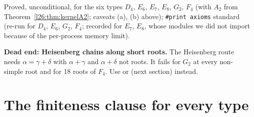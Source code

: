 \begin{status}
Proved, unconditional, for the six types $D_4$, $E_6$, $E_7$, $E_8$, $G_2$, $F_4$ (with $A_2$ from
Theorem~\ref{l26:thm:kernelA2}; caveats (a), (b) above); \texttt{\#print axioms} standard (re-run for $D_4$, $E_6$, $G_2$, $F_4$; recorded for
$E_7$, $E_8$, whose modules we did not import because of the per-process memory limit).
\end{status}

\begin{warning}
\textbf{Dead end: Heisenberg chains along short roots.} The Heisenberg route needs $\alpha=\gamma+\delta$ with $\alpha+\gamma$ and
$\alpha+\delta$ not roots. It fails for $G_2$ at every non-simple root and for 18 roots of $F_4$. Use  or
 (next section) instead.
\end{warning}

\section{The finiteness clause for every type}\label{l26:sec:finiteG}

